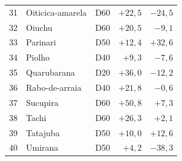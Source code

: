 \begin{longtable}{@{}r p{} c rr@{}}
31 & Oiticica-amarela & D60 & $+22{,}5$ & $-24{,}5$ \\
32 & Oiuchu & D60 & $+20{,}5$ & $-9{,}1$ \\
33 & Parinari & D50 & $+12{,}4$ & $+32{,}6$ \\
34 & Piolho & D40 & $+9{,}3$ & $-7{,}6$ \\
35 & Quarubarana & D20 & $+36{,}0$ & $-12{,}2$ \\
36 & Rabo-de-arraia & D40 & $+21{,}8$ & $-0{,}6$ \\
37 & Sucupira & D60 & $+50{,}8$ & $+7{,}3$ \\
38 & Tachi & D60 & $+26{,}3$ & $+2{,}1$ \\
39 & Tatajuba & D50 & $+10{,}0$ & $+12{,}6$ \\
40 & Umirana & D50 & $+4{,}2$ & $-38{,}3$ \\
\end{longtable}
\endgroup
